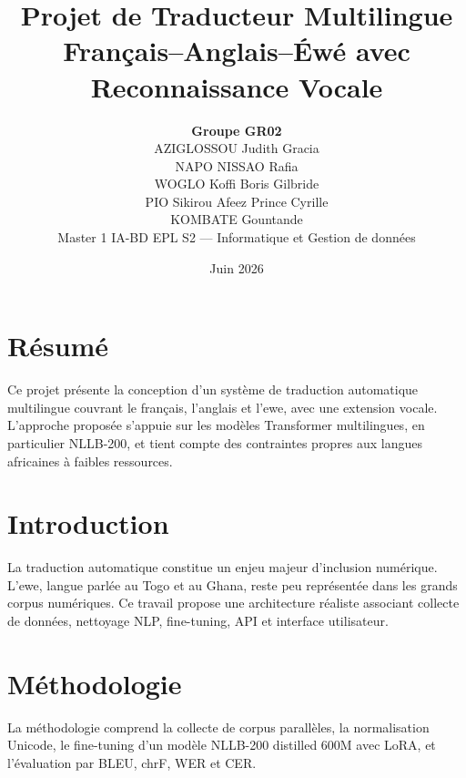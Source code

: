 \documentclass[12pt,a4paper]{report}
\title{Projet de Traducteur Multilingue Français--Anglais--Éwé avec Reconnaissance Vocale}
\author{%
  \textbf{Groupe GR02} \\[0.4em]
  AZIGLOSSOU Judith Gracia \\
  NAPO NISSAO Rafia \\
  WOGLO Koffi Boris Gilbride \\
  PIO Sikirou Afeez Prince Cyrille \\
  KOMBATE Gountande \\[0.6em]
  \small Master 1 IA-BD EPL S2 --- Informatique et Gestion de données
}
\date{Juin 2026}
\begin{document}
\maketitle

\begin{center}
\end{center}

\tableofcontents

\chapter*{Résumé}
Ce projet présente la conception d'un système de traduction automatique multilingue couvrant le français, l'anglais et l'ewe, avec une extension vocale. L'approche proposée s'appuie sur les modèles Transformer multilingues, en particulier NLLB-200, et tient compte des contraintes propres aux langues africaines à faibles ressources.

\chapter{Introduction}
La traduction automatique constitue un enjeu majeur d'inclusion numérique. L'ewe, langue parlée au Togo et au Ghana, reste peu représentée dans les grands corpus numériques. Ce travail propose une architecture réaliste associant collecte de données, nettoyage NLP, fine-tuning, API et interface utilisateur.

\chapter{Méthodologie}
La méthodologie comprend la collecte de corpus parallèles, la normalisation Unicode, le fine-tuning d'un modèle NLLB-200 distilled 600M avec LoRA, et l'évaluation par BLEU, chrF, WER et CER.
\end{document}
